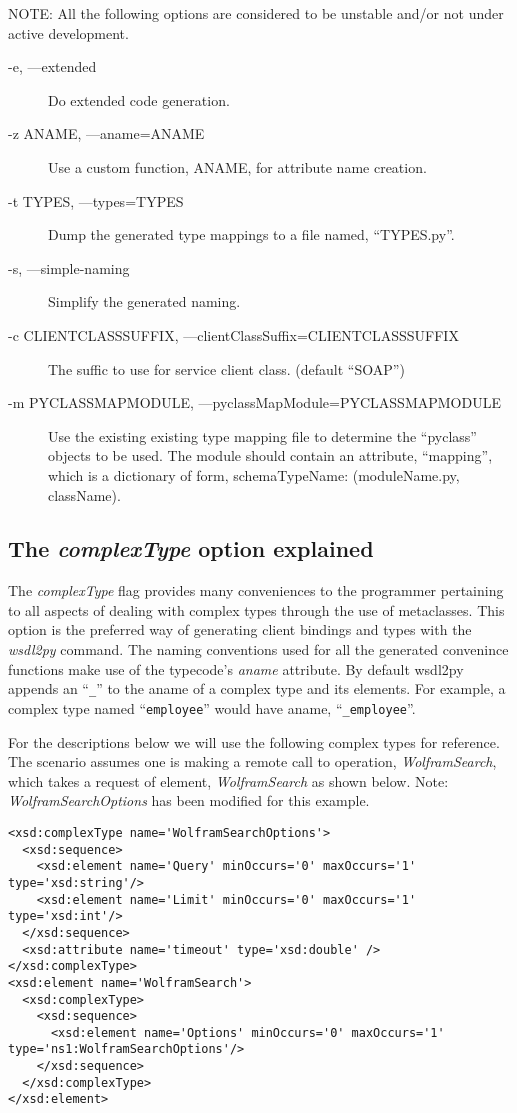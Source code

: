 NOTE: All the following options are considered to be unstable and/or not under
active development.
\begin{description}
\item[-e, ---extended] Do extended code generation.
\item[-z ANAME, ---aname=ANAME] Use a custom function, ANAME, for attribute name
creation.
\item[-t TYPES, ---types=TYPES] Dump the generated type mappings to a file
named, ``TYPES.py''.
\item[-s, ---simple-naming] Simplify the generated naming.
\item[-c CLIENTCLASSSUFFIX, ---clientClassSuffix=CLIENTCLASSSUFFIX] The suffic
to use for service client class. (default ``SOAP'')
\item[-m PYCLASSMAPMODULE, ---pyclassMapModule=PYCLASSMAPMODULE] Use the
existing existing type mapping file to determine the ``pyclass'' objects to be
used.  The module should contain an attribute, ``mapping'', which is a
dictionary of form, {schemaTypeName: (moduleName.py, className)}.
\end{description}

\subsection{The {\it complexType} option explained}
\label{subsection:complexType}

The {\it complexType} flag provides many conveniences to the programmer
pertaining to all aspects of dealing with complex types through the use of 
metaclasses. This option is the preferred way of generating client bindings and
types with the {\it wsdl2py} command.  The naming conventions used for all the
generated convenince functions make use of the typecode's {\it aname} attribute.
 By default wsdl2py appends an ``\verb!_!'' to the aname of a complex type and
 its elements.  For example, a complex type named ``\verb!employee!'' would have
 aname, ``\verb!_employee!''.

For the descriptions below we will use the following complex types for
reference.  The scenario assumes one is making a remote call to operation, {\it
WolframSearch}, which takes a request of element, {\it WolframSearch} as shown
below. {\small Note: {\it WolframSearchOptions} has been modified for this example.}
\begin{verbatim}
<xsd:complexType name='WolframSearchOptions'>
  <xsd:sequence>
    <xsd:element name='Query' minOccurs='0' maxOccurs='1' type='xsd:string'/>
    <xsd:element name='Limit' minOccurs='0' maxOccurs='1' type='xsd:int'/>
  </xsd:sequence>
  <xsd:attribute name='timeout' type='xsd:double' />
</xsd:complexType>
<xsd:element name='WolframSearch'>
  <xsd:complexType>
    <xsd:sequence>
      <xsd:element name='Options' minOccurs='0' maxOccurs='1' type='ns1:WolframSearchOptions'/>
    </xsd:sequence>
  </xsd:complexType>
</xsd:element>
\end{verbatim}

